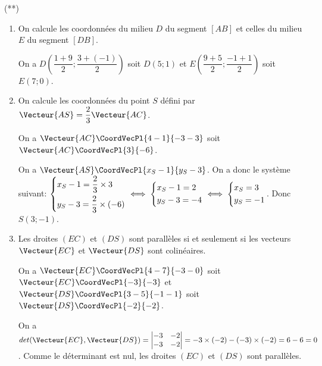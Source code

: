 \documentclass[a4paper]{article}
\begin{document}
\begin{exercice}{(**)}{}
  \begin{enumerate}
    \item On calcule les coordonnées du milieu $D$ du segment $[AB]$ et celles du milieu $E$ du segment $[DB]$.
    
    On a $D(\dfrac{1+9}{2};\dfrac{3+(-1)}{2})$ soit $D(5;1)$ et $E(\dfrac{9+5}{2};\dfrac{-1+1}{2})$ soit $E(7;0)$.

    \item On calcule les coordonnées du point $S$ défini par $\Vecteur{AS}=\dfrac{2}{3}\Vecteur{AC}$.
    
    On a $\Vecteur{AC}\CoordVecPl{4-1}{-3-3}$ soit $\Vecteur{AC}\CoordVecPl{3}{-6}$.

    On a $\Vecteur{AS}\CoordVecPl{x_S-1}{y_S-3}$. On a donc le système suivant:
    $\begin{dcases}
      x_S-1=\dfrac{2}{3}\times 3\\
      y_S-3=\dfrac{2}{3}\times (-6)
    \end{dcases} \iff \begin{dcases}
      x_S-1=2\\
      y_S-3=-4
    \end{dcases} \iff \begin{dcases}
      x_S=3\\
      y_S=-1
    \end{dcases}$. Donc $S(3;-1)$.

    \item Les droites $(EC)$ et $(DS)$ sont parallèles si et seulement si les vecteurs $\Vecteur{EC}$ et $\Vecteur{DS}$ sont colinéaires.
    
    On a $\Vecteur{EC}\CoordVecPl{4-7}{-3-0}$ soit $\Vecteur{EC}\CoordVecPl{-3}{-3}$ et $\Vecteur{DS}\CoordVecPl{3-5}{-1-1}$ soit $\Vecteur{DS}\CoordVecPl{-2}{-2}$.

    On a $det(\Vecteur{EC}, \Vecteur{DS})=\begin{vmatrix}
      -3 & -2\\
      -3 & -2
    \end{vmatrix}=-3\times(-2)-(-3)\times(-2)=6-6=0$. Comme le déterminant est nul, les droites $(EC)$ et $(DS)$ sont parallèles.

    
  \end{enumerate}
    \end{exercice}
\end{document}
